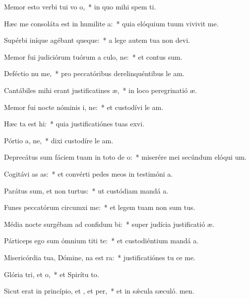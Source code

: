 \item Memor esto verbi tui vo o,~* in quo mihi spem ti.
\item Hæc me consoláta est in humilite a:~* quia elóquium tuum vivivit me.
\item Supérbi iníque agébant queque:~* a lege autem tua non devi.
\item Memor fui judiciórum tuórum a culo, ne:~* et contus sum.
\item Deféctio nu me,~* pro peccatóribus derelinquéntibus le am.
\item Cantábiles mihi erant justificatines æ,~* in loco peregrinatió æ.
\item Memor fui nocte nóminis i, ne:~* et custodívi le am.
\item Hæc ta est hi:~* quia justificatiónes tuas exvi.
\item Pórtio a, ne,~* dixi custodíre le am.
\item Deprecátus sum fáciem tuam in toto de o:~* miserére mei secúndum elóqui um.
\item Cogitávi as as:~* et convérti pedes meos in testimóni a.
\item Parátus sum, et non  turtus:~* ut custódiam mandá a.
\item Funes peccatórum circumxi  me:~* et legem tuam non sum tus.
\item Média nocte surgébam ad confidum bi:~* super judícia justificatió æ.
\item Párticeps ego sum ómnium titi te:~* et custodiéntium mandá a.
\item Misericórdia tua, Dómine, na est ra:~* justificatiónes tu ce me.
\item Glória tri, et o,~* et Spirítu to.
\item Sicut erat in princípio, et , et per,~* et in sǽcula sæculó. men.
